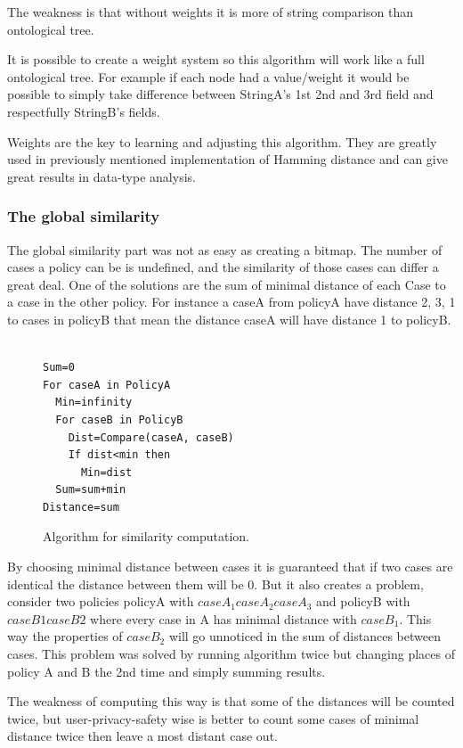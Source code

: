 The weakness is that without weights it is more of string comparison than ontological tree.

It is possible to create a weight system so this algorithm will work like a full ontological tree. For example if each node had a value/weight it would be possible to simply take difference between StringA's 1st 2nd and 3rd field and respectfully StringB's fields.
 
Weights are the key to learning and adjusting this algorithm. They are greatly used in previously mentioned implementation of Hamming distance and can give great results in data-type analysis.

\subsubsection{ The global similarity }
The global similarity part was not as easy as creating a bitmap. The number of cases a policy can be is undefined, and the similarity of those cases can differ a great deal. One of the solutions are the sum of minimal distance of each Case to a case in the other policy. For instance a caseA from policyA have distance 2, 3, 1 to cases in policyB that mean the distance caseA will have distance 1 to policyB. 

\begin{figure}[htpb]

\begin{verbatim}

Sum=0
For caseA in PolicyA
  Min=infinity
  For caseB in PolicyB
    Dist=Compare(caseA, caseB)
    If dist<min then
      Min=dist
  Sum=sum+min
Distance=sum
\end{verbatim}

  \caption{Algorithm for similarity computation.}
  \label{similAlgo}
\end{figure}
 

By choosing minimal distance between cases it is guaranteed that if two cases are identical the distance between them will be 0. But it also creates a problem, consider two policies policyA with ${caseA_1 caseA_2 caseA_3}$ and policyB with ${caseB1 caseB2}$ where every case in A has minimal distance with $caseB_1$. This way the properties of $caseB_2$ will go unnoticed in the sum of distances between cases. This problem was solved by running algorithm twice but changing places of policy A and B the 2nd time and simply summing results.

The weakness of computing this way is that some of the distances will be counted twice, but user-privacy-safety wise is better to count some cases of minimal distance twice then leave a most distant case out.

